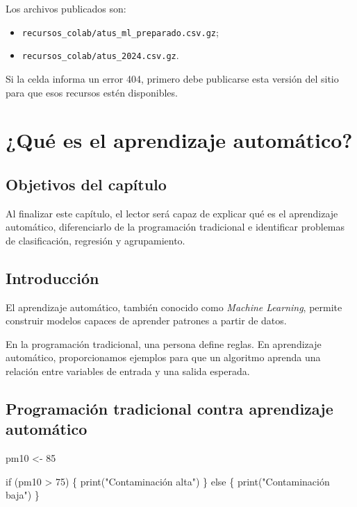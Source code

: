 \documentclass[
  spanish,
  10.5pt,
  letterpaper,
  openany,
  headings=big]{scrbook}
\newenvironment{Shaded}{}{}
\newcommand{\ControlFlowTok}[1]{\textcolor[rgb]{0.84,0.23,0.29}{#1}}
\newcommand{\DecValTok}[1]{\textcolor[rgb]{0.00,0.36,0.77}{#1}}
\newcommand{\FunctionTok}[1]{\textcolor[rgb]{0.44,0.26,0.76}{#1}}
\newcommand{\NormalTok}[1]{\textcolor[rgb]{0.14,0.16,0.18}{#1}}
\newcommand{\OtherTok}[1]{\textcolor[rgb]{0.44,0.26,0.76}{#1}}
\newcommand{\SpecialCharTok}[1]{\textcolor[rgb]{0.00,0.36,0.77}{#1}}
\newcommand{\StringTok}[1]{\textcolor[rgb]{0.01,0.18,0.38}{#1}}
\providecommand{\tightlist}{%
  \setlength{\itemsep}{0pt}\setlength{\parskip}{0pt}}
\begin{document}
Los archivos publicados son:

\begin{itemize}
\tightlist
\item
  \texttt{recursos\_colab/atus\_ml\_preparado.csv.gz};
\item
  \texttt{recursos\_colab/atus\_2024.csv.gz}.
\end{itemize}

Si la celda informa un error 404, primero debe publicarse esta versión
del sitio para que esos recursos estén disponibles.


\chapter{¿Qué es el aprendizaje
automático?}\label{quuxe9-es-el-aprendizaje-automuxe1tico}

\section{Objetivos del capítulo}\label{objetivos-del-capuxedtulo}

Al finalizar este capítulo, el lector será capaz de explicar qué es el
aprendizaje automático, diferenciarlo de la programación tradicional e
identificar problemas de clasificación, regresión y agrupamiento.

\section{Introducción}\label{introducciuxf3n}

El aprendizaje automático, también conocido como \emph{Machine
Learning}, permite construir modelos capaces de aprender patrones a
partir de datos.

En la programación tradicional, una persona define reglas. En
aprendizaje automático, proporcionamos ejemplos para que un algoritmo
aprenda una relación entre variables de entrada y una salida esperada.

\section{Programación tradicional contra aprendizaje
automático}\label{programaciuxf3n-tradicional-contra-aprendizaje-automuxe1tico}

\begin{Shaded}
\begin{Highlighting}[]
\NormalTok{pm10 }\OtherTok{\textless{}{-}} \DecValTok{85}

\ControlFlowTok{if}\NormalTok{ (pm10 }\SpecialCharTok{\textgreater{}} \DecValTok{75}\NormalTok{) \{}
  \FunctionTok{print}\NormalTok{(}\StringTok{"Contaminación alta"}\NormalTok{)}
\NormalTok{\} }\ControlFlowTok{else}\NormalTok{ \{}
  \FunctionTok{print}\NormalTok{(}\StringTok{"Contaminación baja"}\NormalTok{)}
\NormalTok{\}}
\end{Highlighting}
\end{Shaded}
\end{document}

